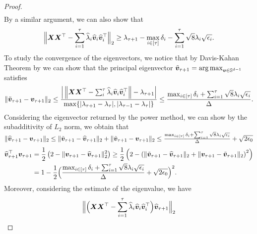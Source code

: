 \begin{proof}
\begin{align*}
    \end{align*}
    By a similar argument, we can also show that
    \begin{align*}
        \Big\Vert\boldsymbol{X}\boldsymbol{X}^\top-\sum_{i=1}^{\tau}\widehat{\lambda}_i\widehat{\boldsymbol{v}}_i\widehat{\boldsymbol{v}}_i^\top\Big\Vert_2\geq\lambda_{\tau+1}-\max_{i\in[\tau]}\delta_i-\sum_{i=1}^{\tau}\sqrt 8\lambda_i\sqrt{\epsilon_i}.
    \end{align*}
    To study the convergence of the eigenvectors, we notice that by Davis-Kahan Theorem by \citep{yu2015useful} we can show that the principal eigenvector $\tilde{\boldsymbol{v}}_{\tau+1}=\operatorname*{arg\,max}_{\boldsymbol{v}\in\mathbb{S}^{d-1}}$ satisfies
    \begin{align*}
        \Vert\tilde{\boldsymbol{v}}_{\tau+1}-\boldsymbol{v}_{\tau+1}\Vert_2\leq\frac{\Big|\left\Vert\boldsymbol{X}\boldsymbol{X}^\top-\sum_{i}^{\tau}\widehat{\lambda}_i\widehat{\boldsymbol{v}}_i\widehat{\boldsymbol{v}}_i^\top\right\Vert-\lambda_{\tau+1}\Big|}{\max\{|\lambda_{\tau+1}-\lambda_{\tau}|,|\lambda_{\tau-1}-\lambda_{\tau}|\}}\leq\frac{\max_{i\in[\tau]}\delta_i+\sum_{i=1}^{\tau}\sqrt 8\lambda_i\sqrt{\epsilon_i}}{\Delta}.
    \end{align*}
    Considering the eigenvector returned by the power method, we can show by the subadditivity of $L_2$ norm, we obtain that $\Vert\widehat{\boldsymbol{v}}_{\tau+1}-\boldsymbol{v}_{\tau+1}\Vert_2\leq \Vert\tilde{\boldsymbol{v}}_{\tau+1}-\widehat{\boldsymbol{v}}_{\tau+1}\Vert_2+\Vert\tilde{\boldsymbol{v}}_{\tau+1}-\boldsymbol{v}_{\tau+1}\Vert_2\leq \frac{\max_{i\in[\tau]}\delta_i+\sum_{i=1}^{\tau}\sqrt{8}\lambda_i\sqrt{\epsilon_i}}{\Delta}+\sqrt{2\epsilon_0}$
    \begin{align*}
        \widehat{\boldsymbol{v}}_{\tau+1}^\top\boldsymbol{v}_{\tau+1}&=\frac{1}{2}\left(2-\Vert\boldsymbol{v}_{\tau+1}-\widehat{\boldsymbol{v}}_{\tau+1}\Vert_2^2\right)\geq\frac{1}{2}\left(2-\left(\Vert\tilde{\boldsymbol{v}}_{\tau+1}-\widehat{\boldsymbol{v}}_{\tau+1}\Vert_2+\Vert\boldsymbol{v}_{\tau+1}-\tilde{\boldsymbol{v}}_{\tau+1}\Vert_2\right)^2\right)\\
        &=1-\frac{1}{2}\Big(\frac{\max_{i\in[\tau]}\delta_i+\sum_{i=1}^{\tau}\sqrt{8}\lambda_i\sqrt{\epsilon_i}}{\Delta}+\sqrt{2\epsilon_0}\Big)^2.
    \end{align*}
    Moreover, considering the estimate of the eigenvalue, we have 
    \begin{align*}
        &\Big\Vert\Big(\bfa X\bfa X^\top -\sum_{i=1}^{\tau}\wh\lambda_i\wha v_i\wha v_i^\top\Big)\wha v_{\tau+1}\Big\Vert_2\\

\end{align*}
\end{proof}
